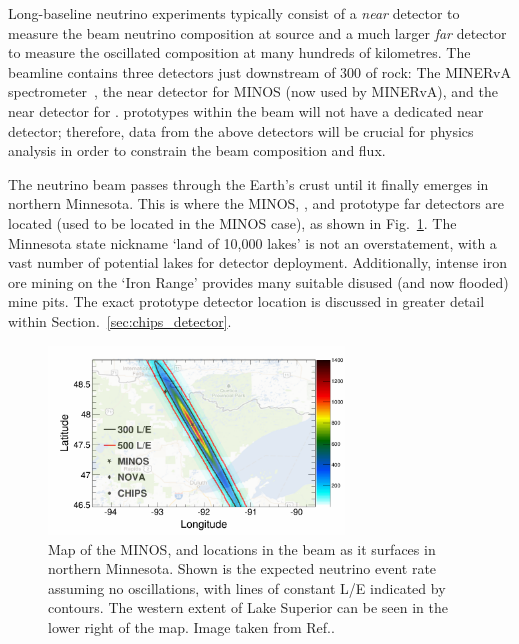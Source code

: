 Long-baseline neutrino experiments typically consist of a \emph{near} detector to measure the beam
neutrino composition at source and a much larger \emph{far} detector to measure the oscillated
composition at many hundreds of kilometres. The \numi beamline contains three detectors just
downstream of \unit{300}{} of rock: The MINERvA spectrometer~\cite{mcfarland2006}, the
near detector for MINOS (now used by MINERvA), and the near detector for \nova. \chips prototypes
within the \numi beam will not have a dedicated near detector; therefore, data from the above
detectors will be crucial for physics analysis in order to constrain the beam composition and
flux.

The \numi neutrino beam passes through the Earth's crust until it finally emerges in northern
Minnesota. This is where the MINOS, \nova, and prototype \chips far detectors are located (used to
be located in the MINOS case), as shown in Fig.~\ref{fig:numi_map}. The Minnesota state nickname
`land of 10,000 lakes' is not an overstatement, with a vast number of potential lakes for \chips
detector deployment. Additionally, intense iron ore mining on the `Iron Range' provides many
suitable disused (and now flooded) mine pits. The exact \chipsfive prototype detector location is
discussed in greater detail within Section.~\ref{sec:chips_detector}.

\begin{figure} %
    \includegraphics[width=0.7\textwidth]{diagrams/4-chips/numi_map.png}
    \caption[Map of detector locations in the \numi beam.]
    {Map of the MINOS, \nova and \chips locations in the \numi beam as it surfaces in northern
        Minnesota. Shown is the expected neutrino event rate assuming no oscillations, with lines
        of constant L/E indicated by contours. The western extent of Lake Superior can be seen in
        the lower right of the map. Image taken from Ref.\cite{adamson2013}.}
    \label{fig:numi_map}
\end{figure}

